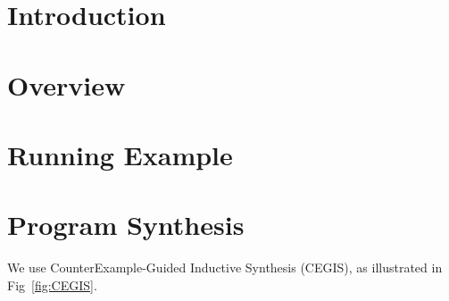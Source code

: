 \documentclass{sig-alternate-05-2015}
\begin{document}


%
%

%
%
\printccsdesc


\keywords{}

\section{Introduction}
\section{Overview}
\section{Running Example}
\section{Program Synthesis}

We use CounterExample-Guided Inductive Synthesis (CEGIS), as illustrated in Fig~\ref{fig:CEGIS}.
\end{document}
